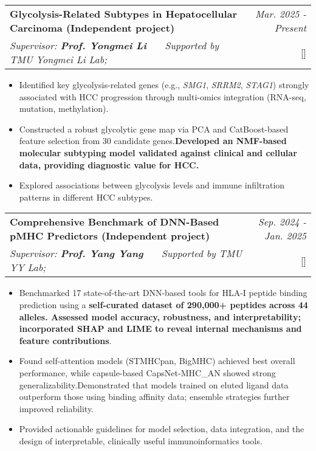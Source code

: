 \documentclass[a4paper,11pt]{article}
\makeatletter
\newcommand{\resumeProject}[4]{
\vspace{0.5mm}\item
    \begin{tabular*}{0.98\textwidth}[t]{l@{\extracolsep{\fill}}r}
        \textbf{#1} & \textit{\footnotesize{#3}} \\
        \footnotesize{\textit{#2}} & \footnotesize{#4}
    \end{tabular*}
    \vspace{-2.4mm}
}
\newcommand{\resumeItemListStart}{\begin{itemize}[leftmargin=*,labelsep=1mm,itemsep=0.5mm]}
\newcommand{\resumeItemListEnd}{\end{itemize}\vspace{-2mm}}
\makeatother
\begin{document}
\begin{justify}
\resumeProject
  {Glycolysis-Related Subtypes in Hepatocellular Carcinoma \small{(Independent project)}}
  {Supervisor: \textbf{Prof. Yongmei Li} \ \ \ Supported by TMU Yongmei Li Lab;}
  {Mar. 2025 - Present}
  {{}[\href{https://github.com/wunaiwuhuang/materials/tree/main/Award\_and\_honour\%E8\%8E\%B7\%E5\%A5\%96\%E8\%AF\%81\%E6\%98\%8E/innovation\%20and\%20Entrepreneurship\%20Competition}{\textcolor{darkblue}{\faGithub}}]}
\resumeItemListStart
  \item Identified key glycolysis-related genes (e.g., \textit{SMG1}, \textit{SRRM2}, \textit{STAG1}) strongly associated with HCC progression through multi-omics integration (RNA-seq, mutation, methylation).
  \item Constructed a robust glycolytic gene map via PCA and CatBoost-based feature selection from 30 candidate genes.\textbf{Developed an NMF-based molecular subtyping model validated against clinical and cellular data, providing diagnostic value for HCC.}
  \item Explored associations between glycolysis levels and immune infiltration patterns in different HCC subtypes.
\resumeItemListEnd

\resumeProject
  {Comprehensive Benchmark of DNN-Based pMHC Predictors \small{(Independent project)}}
  {Supervisor: \textbf{Prof. Yang Yang} \ \ \ Supported by TMU YY Lab;}
  {Sep. 2024 - Jan. 2025}
  {{}[\href{https://github.com/wunaiwuhuang/materials/tree/main/Award\_and\_honour\%E8\%8E\%B7\%E5\%A5\%96\%E8\%AF\%81\%E6\%98\%8E/innovation\%20and\%20Entrepreneurship\%20Competition}{\textcolor{darkblue}{\faGithub}}]}
\resumeItemListStart
  \item Benchmarked 17 state-of-the-art DNN-based tools for HLA-I peptide binding prediction using a \textbf{self-curated dataset of 290,000+ peptides across 44 alleles. Assessed model accuracy, robustness, and interpretability; incorporated SHAP and LIME to reveal internal mechanisms and feature contributions}.
  \item Found self-attention models (STMHCpan, BigMHC) achieved best overall performance, while capsule-based CapsNet-MHC\_AN showed strong generalizability.Demonstrated that models trained on eluted ligand data outperform those using binding affinity data; ensemble strategies further improved reliability.
  \item Provided actionable guidelines for model selection, data integration, and the design of interpretable, clinically useful immunoinformatics tools.
\resumeItemListEnd


\end{justify}
\end{document}
